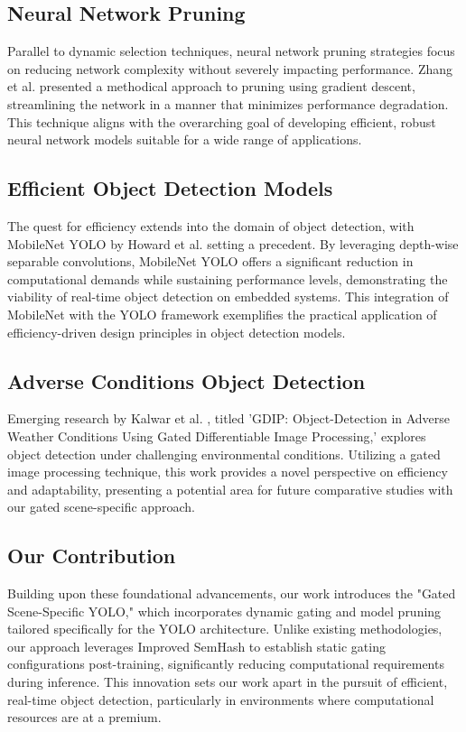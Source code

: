 \subsection{Neural Network Pruning}

Parallel to dynamic selection techniques, neural network pruning strategies focus on reducing network complexity without severely impacting performance. Zhang et al. \cite{zhang2018} presented a methodical approach to pruning using gradient descent, streamlining the network in a manner that minimizes performance degradation. This technique aligns with the overarching goal of developing efficient, robust neural network models suitable for a wide range of applications.

\subsection{Efficient Object Detection Models}

The quest for efficiency extends into the domain of object detection, with MobileNet YOLO by Howard et al. \cite{howard2017} setting a precedent. By leveraging depth-wise separable convolutions, MobileNet YOLO offers a significant reduction in computational demands while sustaining performance levels, demonstrating the viability of real-time object detection on embedded systems. This integration of MobileNet with the YOLO framework exemplifies the practical application of efficiency-driven design principles in object detection models.

\subsection{Adverse Conditions Object Detection}

Emerging research by Kalwar et al. \cite{kalwar2023}, titled 'GDIP: Object-Detection in Adverse Weather Conditions Using Gated Differentiable Image Processing,' explores object detection under challenging environmental conditions. Utilizing a gated image processing technique, this work provides a novel perspective on efficiency and adaptability, presenting a potential area for future comparative studies with our gated scene-specific approach.

\subsection{Our Contribution}

Building upon these foundational advancements, our work introduces the "Gated Scene-Specific YOLO," which incorporates dynamic gating and model pruning tailored specifically for the YOLO architecture. Unlike existing methodologies, our approach leverages Improved SemHash to establish static gating configurations post-training, significantly reducing computational requirements during inference. This innovation sets our work apart in the pursuit of efficient, real-time object detection, particularly in environments where computational resources are at a premium.


\clearpage
